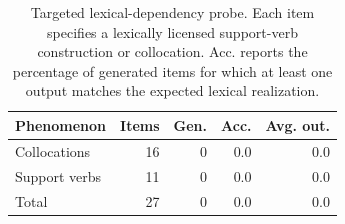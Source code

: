 \begin{table}[t]
\centering
\footnotesize
\setlength{\tabcolsep}{4pt}
\begin{tabular}{@{}lrrrr@{}}
\toprule
Phenomenon & Items & Gen. & Acc. & Avg. out. \\
\midrule
Collocations & 16 & 0 & 0.0 & 0.0 \\
Support verbs & 11 & 0 & 0.0 & 0.0 \\
\midrule
Total & 27 & 0 & 0.0 & 0.0 \\
\bottomrule
\end{tabular}
\caption{Targeted lexical-dependency probe. Each item specifies a
lexically licensed support-verb construction or collocation. Acc.
reports the percentage of generated items for which at least one
output matches the expected lexical realization.}
\label{tab:lexical-probe}
\end{table}
